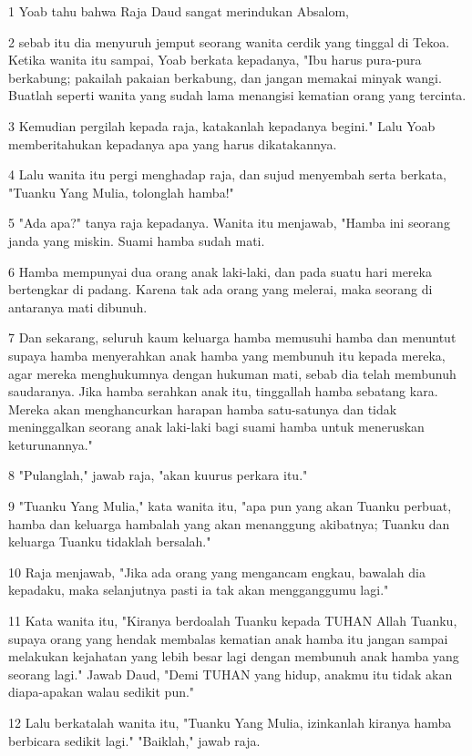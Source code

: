 \par 1 Yoab tahu bahwa Raja Daud sangat merindukan Absalom,
\par 2 sebab itu dia menyuruh jemput seorang wanita cerdik yang tinggal di Tekoa. Ketika wanita itu sampai, Yoab berkata kepadanya, "Ibu harus pura-pura berkabung; pakailah pakaian berkabung, dan jangan memakai minyak wangi. Buatlah seperti wanita yang sudah lama menangisi kematian orang yang tercinta.
\par 3 Kemudian pergilah kepada raja, katakanlah kepadanya begini." Lalu Yoab memberitahukan kepadanya apa yang harus dikatakannya.
\par 4 Lalu wanita itu pergi menghadap raja, dan sujud menyembah serta berkata, "Tuanku Yang Mulia, tolonglah hamba!"
\par 5 "Ada apa?" tanya raja kepadanya. Wanita itu menjawab, "Hamba ini seorang janda yang miskin. Suami hamba sudah mati.
\par 6 Hamba mempunyai dua orang anak laki-laki, dan pada suatu hari mereka bertengkar di padang. Karena tak ada orang yang melerai, maka seorang di antaranya mati dibunuh.
\par 7 Dan sekarang, seluruh kaum keluarga hamba memusuhi hamba dan menuntut supaya hamba menyerahkan anak hamba yang membunuh itu kepada mereka, agar mereka menghukumnya dengan hukuman mati, sebab dia telah membunuh saudaranya. Jika hamba serahkan anak itu, tinggallah hamba sebatang kara. Mereka akan menghancurkan harapan hamba satu-satunya dan tidak meninggalkan seorang anak laki-laki bagi suami hamba untuk meneruskan keturunannya."
\par 8 "Pulanglah," jawab raja, "akan kuurus perkara itu."
\par 9 "Tuanku Yang Mulia," kata wanita itu, "apa pun yang akan Tuanku perbuat, hamba dan keluarga hambalah yang akan menanggung akibatnya; Tuanku dan keluarga Tuanku tidaklah bersalah."
\par 10 Raja menjawab, "Jika ada orang yang mengancam engkau, bawalah dia kepadaku, maka selanjutnya pasti ia tak akan mengganggumu lagi."
\par 11 Kata wanita itu, "Kiranya berdoalah Tuanku kepada TUHAN Allah Tuanku, supaya orang yang hendak membalas kematian anak hamba itu jangan sampai melakukan kejahatan yang lebih besar lagi dengan membunuh anak hamba yang seorang lagi." Jawab Daud, "Demi TUHAN yang hidup, anakmu itu tidak akan diapa-apakan walau sedikit pun."
\par 12 Lalu berkatalah wanita itu, "Tuanku Yang Mulia, izinkanlah kiranya hamba berbicara sedikit lagi." "Baiklah," jawab raja.

